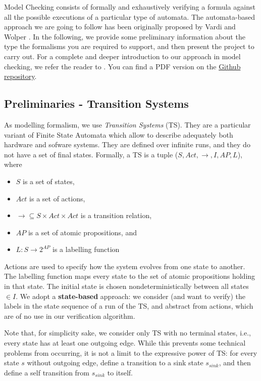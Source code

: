 \documentclass{article}
\begin{document}
Model Checking consists of formally and exhaustively verifying a formula 
against all the possible executions of a particular type of automata. 
The automata-based approach we are going to follow has been originally proposed by 
Vardi and Wolper \cite{VarWol}.
In the following, we provide some preliminary information 
about the type the formalisms you are required to support, 
and then present the project to carry out. 
For a complete and deeper introduction to our approach in model checking, 
we refer the reader to \cite{BaKa}. You can find a PDF version on the 
\href{https://github.com/francescopont/MiniCheck.git}{Github repository}.


\subsection{Preliminaries - Transition Systems}
As modelling formalism, we use \emph{Transition Systems} (TS). They are a particular variant 
of Finite State Automata which allow to describe adequately both hardware and sofware systems. 
They are defined over infinite runs, and they do not have a set of final states. 
Formally, a TS is a tuple ($S, Act, \rightarrow, I, AP, L$), where 
\begin{itemize}
    \item $S$ is a set of states,
    \item $Act$ is a set of actions,
    \item $\longrightarrow \subseteq S \times Act \times Act$ is a transition relation,
    \item $AP$ is a set of atomic propositions, and 
    \item $L : S \rightarrow 2^{AP}$ is a labelling function
\end{itemize}
Actions are used to specify how the system evolves from one state to another. The labelling function 
maps every state to the set of atomic propositions holding in that state. The initial state is chosen 
nondeterministically between all states $\in I$.
We adopt a \textbf{state-based} approach: we consider (and want to verify) the labels in the state sequence 
of a run of the TS, and abstract from actions, which are of no use in our verification algorithm. 

Note that, for simplicity sake, we consider only TS with no terminal states, i.e., every state has at least 
one outgoing edge. While this prevents some technical problems from occurring, it is not a limit to the 
expressive power of TS: for every state $s$ without outgoing edge, define a transition to a sink state 
$s_ {sink}$, and then define a self transition from $s_ {sink}$ to itself.
\end{document}

